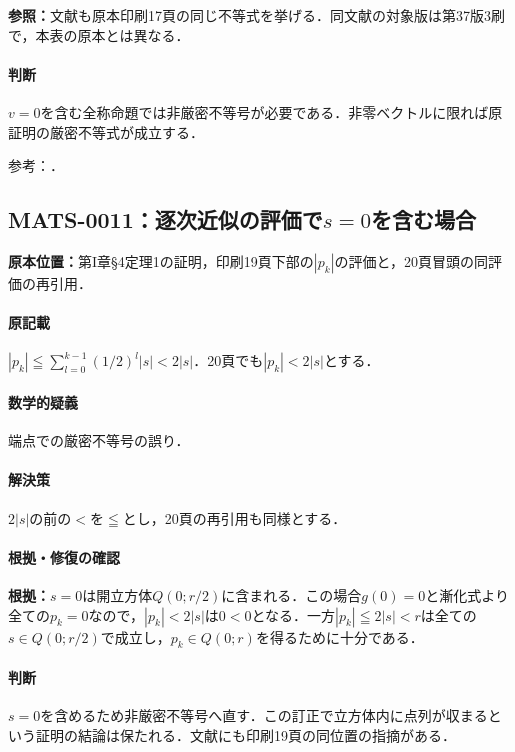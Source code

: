 \documentclass[a4paper,10pt]{ltjsarticle}
\begin{document}
\textbf{参照：}文献\cite{paper2017}も原本印刷17頁の同じ不等式を挙げる．同文献の対象版は第37版3刷で，本表の原本とは異なる．

\paragraph{判断}$v=0$を含む全称命題では非厳密不等号が必要である．非零ベクトルに限れば原証明の厳密不等式が成立する．

\noindent 参考：\cite{paper2017}．

\subsection*{MATS-0011：逐次近似の評価で$s=0$を含む場合}\label{math:MATS-0011}
\noindent\textbf{原本位置：}第I章\S4定理1の証明，印刷19頁下部の$|p_k|$の評価と，20頁冒頭の同評価の再引用．

\paragraph{原記載}$|p_k|\leqq\sum_{l=0}^{k-1}(1/2)^l|s|<2|s|$．20頁でも$|p_k|<2|s|$とする．

\paragraph{数学的疑義}端点での厳密不等号の誤り．

\paragraph{解決策}$2|s|$の前の$<$を$\leqq$とし，20頁の再引用も同様とする．

\paragraph{根拠・修復の確認}\textbf{根拠：}$s=0$は開立方体$Q(0;r/2)$に含まれる．この場合$g(0)=0$と漸化式より全ての$p_k=0$なので，$|p_k|<2|s|$は$0<0$となる．一方$|p_k|\leqq2|s|<r$は全ての$s\in Q(0;r/2)$で成立し，$p_k\in Q(0;r)$を得るために十分である．

\paragraph{判断}$s=0$を含めるため非厳密不等号へ直す．この訂正で立方体内に点列が収まるという証明の結論は保たれる．文献\cite{paper2017}にも印刷19頁の同位置の指摘がある．
\end{document}
